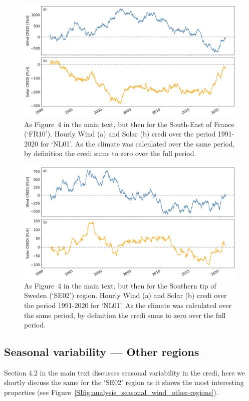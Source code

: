 \documentclass[a4paper,11pt]{extarticle}
\newcommand{\credi}[0]{{\sc credi}}
\begin{document}
\begin{figure}[hb]
    \centering
    \includegraphics[width=\textwidth]{CREDI_interannual_FR10}
    \caption{
        As Figure~4 in the main text, but then for the South-East of France (`FR10').
        Hourly Wind (a) and Solar (b) \credi{} over the period 1991-2020 for `NL01'. 
        As the climate was calculated over the same period, by definition the \credi{} sums to zero over the full period.}
    \label{SIfig:analysis_decadal_other-regions_A}
\end{figure}

\begin{figure}[ht]
    \centering
    \includegraphics[width=\textwidth]{CREDI_interannual_SE02}
    \caption{
        As Figure~4 in the main text, but then for the Southern tip of Sweden (`SE02') region. 
        Hourly Wind (a) and Solar (b) \credi{} over the period 1991-2020 for `NL01'. 
        As the climate was calculated over the same period, by definition the \credi{} sums to zero over the full period.}
    \label{SIfig:analysis_decadal_other-regions_B}
\end{figure}

\newpage
\subsection{Seasonal variability --- Other regions}
Section 4.2 in the main text discusses seasonal variability in the \credi{}, here we shortly discuss the same for the `SE02' region as it shows the most interesting properties (see Figure~\ref{SIfig:analysis_seasonal_wind_other-regions}). 
\end{document}
